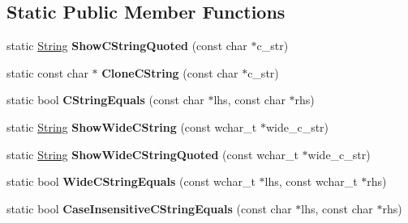 \subsection*{Static Public Member Functions}
\begin{DoxyCompactItemize}
\item 
\mbox{\label{classtesting_1_1internal_1_1_string_a5796cb5907743f97db0903bf91b4ba60}} 
static \mbox{\hyperlink{classtesting_1_1internal_1_1_string}{String}} {\bfseries Show\+C\+String\+Quoted} (const char $\ast$c\+\_\+str)
\item 
\mbox{\label{classtesting_1_1internal_1_1_string_ad81c1cb9dbc8675ded003ee44ed43f29}} 
static const char $\ast$ {\bfseries Clone\+C\+String} (const char $\ast$c\+\_\+str)
\item 
\mbox{\label{classtesting_1_1internal_1_1_string_a8bea7b33e7effbd299a0b4a5522ea96e}} 
static bool {\bfseries C\+String\+Equals} (const char $\ast$lhs, const char $\ast$rhs)
\item 
\mbox{\label{classtesting_1_1internal_1_1_string_a9d28874e7ef8217e7c3bc767a4e02732}} 
static \mbox{\hyperlink{classtesting_1_1internal_1_1_string}{String}} {\bfseries Show\+Wide\+C\+String} (const wchar\+\_\+t $\ast$wide\+\_\+c\+\_\+str)
\item 
\mbox{\label{classtesting_1_1internal_1_1_string_a2ed8c32dd48155c2cf66caebeab3d92b}} 
static \mbox{\hyperlink{classtesting_1_1internal_1_1_string}{String}} {\bfseries Show\+Wide\+C\+String\+Quoted} (const wchar\+\_\+t $\ast$wide\+\_\+c\+\_\+str)
\item 
\mbox{\label{classtesting_1_1internal_1_1_string_ab0373bf6e96453d6ca0de2e68df13d3a}} 
static bool {\bfseries Wide\+C\+String\+Equals} (const wchar\+\_\+t $\ast$lhs, const wchar\+\_\+t $\ast$rhs)
\item 
\mbox{\label{classtesting_1_1internal_1_1_string_a116ca435d63306927ba19f90a3596787}} 
static bool {\bfseries Case\+Insensitive\+C\+String\+Equals} (const char $\ast$lhs, const char $\ast$rhs)

\end{DoxyCompactItemize}
